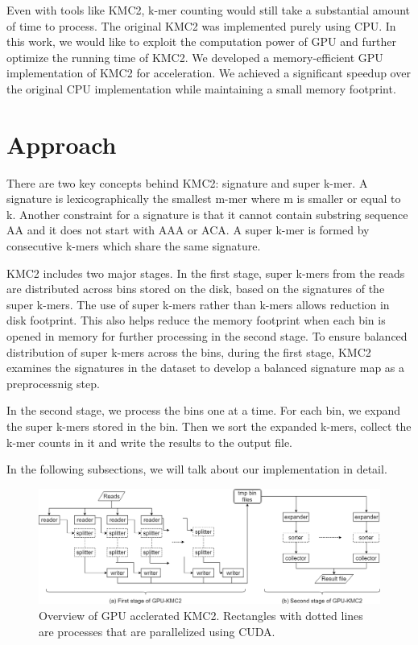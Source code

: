 \documentclass{bioinfo}
\begin{document}
Even with tools like KMC2, k-mer counting would still take a substantial amount of time to
process. The original KMC2 was implemented purely using CPU.
In this work, we would like to exploit the computation power of GPU and further optimize
the running time of KMC2. We developed a memory-efficient GPU implementation of KMC2 for
acceleration.
We achieved a significant speedup over the original CPU implementation while maintaining a
small memory footprint.

\section{Approach}
There are two key concepts behind KMC2: signature and super k-mer.
A signature is lexicographically the smallest m-mer where m is smaller or equal to k.
Another constraint for a signature is that it cannot contain substring sequence AA and it
does not start with AAA or ACA.
A super k-mer is formed by consecutive k-mers which share the same signature.

KMC2 includes two major stages. In the first stage, super k-mers from the reads are 
distributed across bins stored on the disk, based on the signatures of the super k-mers. 
The use of super k-mers rather than k-mers allows reduction in disk footprint. This also 
helps reduce the memory footprint when each bin is opened in memory for further processing 
in the second stage. To ensure balanced distribution of super k-mers across the bins, 
during the first stage, KMC2 examines the signatures in the dataset to develop a balanced 
signature map as a preprocessnig step.

In the second stage, we process the bins one at a time. For each bin, we expand the super
k-mers stored in the bin. Then we sort the expanded k-mers, collect the k-mer counts in it 
and write the results to the output file.

In the following subsections, we will talk about our implementation in detail.
\begin{figure}[t]
	\centering
	\includegraphics[scale=0.5]{kmc2.png}
	\caption{Overview of GPU acclerated KMC2. Rectangles with dotted lines are processes
	that are parallelized using CUDA.}\label{fig:01}
\end{figure}
\enlargethispage{6pt}
\end{document}
